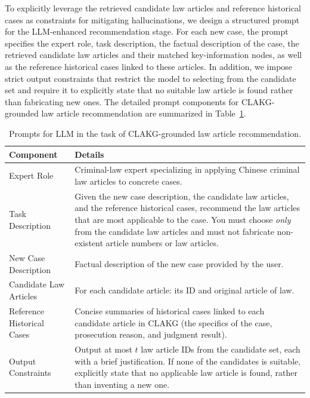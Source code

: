 \documentclass[review,times,nonatbib]{elsarticle} %
\renewcommand{\textcolor}[2]{#2}
\begin{document}
\textcolor{blue}{To explicitly leverage the retrieved candidate law articles and reference historical cases as constraints for mitigating hallucinations, we design a structured prompt for the LLM-enhanced recommendation stage. For each new case, the prompt specifies the expert role, task description, the factual description of the case, the retrieved candidate law articles and their matched key-information nodes, as well as the reference historical cases linked to these articles. In addition, we impose strict output constraints that restrict the model to selecting from the candidate set and require it to explicitly state that no suitable law article is found rather than fabricating new ones. The detailed prompt components for CLAKG-grounded law article recommendation are summarized in Table~\ref{tab:llm_rec_prompt}.}


\begin{table}[h]
\caption{\textcolor{blue}{Prompts for LLM in the task of CLAKG-grounded law article recommendation.}}
\label{tab:llm_rec_prompt}
\setlength{\tabcolsep}{4pt}
\begin{tabular}{m{}|m{}}
\textbf{Component} & \textbf{Details} \\
\hline
Expert Role & Criminal-law expert specializing in applying Chinese criminal law articles to concrete cases. \\
\hline
Task Description & 
Given the new case description, the candidate law articles, and the reference historical cases, recommend the law articles that are most applicable to the case. You must choose \emph{only} from the candidate law articles and must not fabricate non-existent article numbers or law articles. \\
\hline
New Case Description & 
Factual description of the new case provided by the user. \\
\hline
Candidate Law Articles & 
For each candidate article: its ID and original article of law. \\
\hline
Reference Historical Cases & 
Concise summaries of historical cases linked to each candidate article in CLAKG (the specifics of the case, prosecution reason, and judgment result). \\
\hline
Output Constraints & 
Output at most $t$ law article IDs from the candidate set, each with a brief justification. If none of the candidates is suitable, explicitly state that no applicable law article is found, rather than inventing a new one. \\
\end{tabular}
\end{table}
\end{document}
